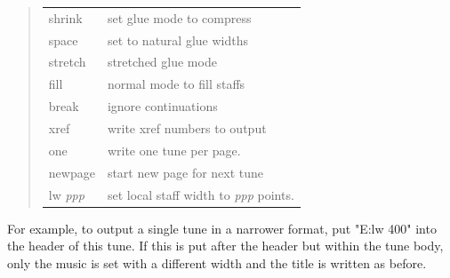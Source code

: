 \documentclass[a4paper]{article}
\begin{document}
\begin{quote}
\begin{tabular}{ll}
shrink  &  set glue mode to compress \\
space   &  set to natural glue widths \\
stretch &  stretched glue mode \\
fill    &  normal mode to fill staffs \\
break   &  ignore continuations \\
xref    &  write xref numbers to output \\
one     &  write one tune per page. \\
newpage &  start new page for next tune \\
lw {\it ppp}  &  set local staff width to {\it ppp} points.
\end{tabular}
\end{quote}
For example, to output a single tune in a narrower format,
put "E:lw 400" into the header of this tune. If this is put
after the header but within the tune body, only the music is set 
with a different width and the title is written as before.
\end{document}
